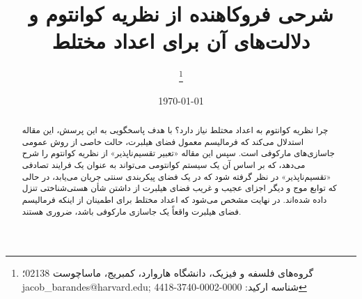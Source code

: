 \documentclass{article}
\begin{document}
\title{شرحی فروکاهنده از نظریه کوانتوم و دلالت‌های آن برای اعداد مختلط}
\author{\thanks{گروه‌های فلسفه و فیزیک، دانشگاه هاروارد، کمبریج، ماساچوست 02138؛ jacob\_barandes@harvard.edu; شناسه ارکید: 0000-0002-3740-4418}
}
\date{\today}

\maketitle

\begin{abstract}
چرا نظریه کوانتوم به اعداد مختلط نیاز دارد؟ با هدف پاسخگویی به این پرسش، این مقاله استدلال می‌کند که فرمالیسم معمول فضای هیلبرت، حالت خاصی از روش عمومی جاسازی‌های مارکوفی  است. سپس این مقاله «تعبیر تقسیم‌ناپذیر» از نظریه کوانتوم را شرح می‌دهد، که بر اساس آن یک سیستم کوانتومی می‌تواند به عنوان یک فرایند تصادفی «تقسیم‌ناپذیر» در نظر گرفته شود که در یک فضای پیکربندی سنتی  جریان می‌یابد، در حالی که توابع موج و دیگر اجزای عجیب و غریب فضای هیلبرت از داشتن شأن هستی‌شناختی تنزل داده شده‌اند. در نهایت مشخص می‌شود که اعداد مختلط برای اطمینان از اینکه فرمالیسم فضای هیلبرت واقعاً یک جاسازی مارکوفی باشد، ضروری هستند.
\end{abstract}
\end{document}
